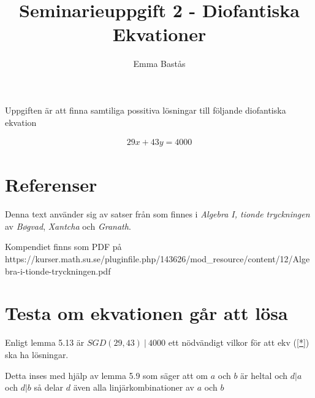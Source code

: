 \documentclass{article}
\title{Seminarieuppgift 2 - Diofantiska Ekvationer}
\author{Emma Bastås}
\begin{document}
\maketitle

Uppgiften är att finna samtiliga possitiva lösningar till följande diofantiska ekvation

\begin{gather*}
  29x + 43y = 4000 \label{*}\tag{*}
\end{gather*}

\section*{Referenser}

Denna text använder sig av satser från som finnes i \emph{Algebra I, tionde tryckningen} av \emph{Bøgvad}, \emph{Xantcha} och \emph{Granath}.

Kompendiet finns som PDF på https://kurser.math.su.se/pluginfile.php/143626/mod\_resource/content/12/Algebra-i-tionde-tryckningen.pdf

%
%
%
%
%

\section{Testa om ekvationen går att lösa}

Enligt lemma 5.13 är $SGD(29, 43)\: |\: 4000$ ett nödvändigt vilkor för att ekv (\ref{*}) ska ha lösningar.

Detta inses med hjälp av lemma 5.9 som säger att om $a$ och $b$ är heltal och $d | a$ och $d | b$ så delar $d$ även alla linjärkombinationer av $a$ och $b$
\end{document}

